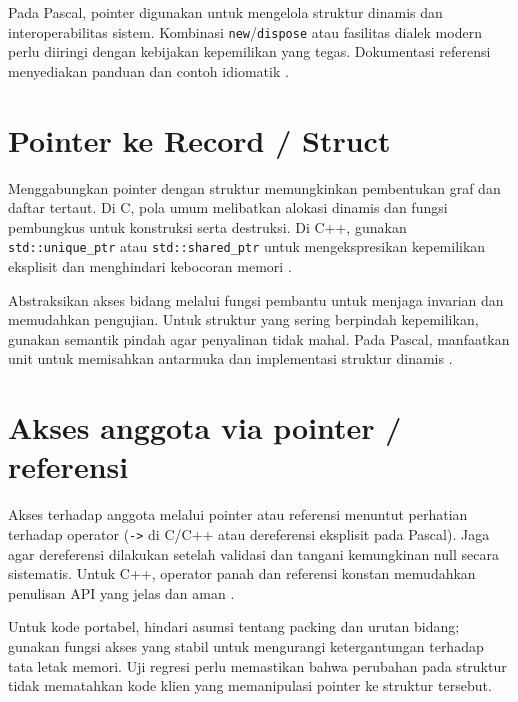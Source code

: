 \documentclass[../main.tex]{subfiles}
\begin{document}
Pada Pascal, pointer digunakan untuk mengelola struktur dinamis dan interoperabilitas sistem. Kombinasi \texttt{new}/\texttt{dispose} atau fasilitas dialek modern perlu diiringi dengan kebijakan kepemilikan yang tegas. Dokumentasi referensi menyediakan panduan dan contoh idiomatik \parencite{free-pascal-docs,gnu-c-manual}.

\section{Pointer ke Record / Struct}
Menggabungkan pointer dengan struktur memungkinkan pembentukan graf dan daftar tertaut. Di C, pola umum melibatkan alokasi dinamis dan fungsi pembungkus untuk konstruksi serta destruksi. Di C++, gunakan \texttt{std::unique_ptr} atau \texttt{std::shared_ptr} untuk mengekspresikan kepemilikan eksplisit dan menghindari kebocoran memori \parencite{cpp-reference}.

Abstraksikan akses bidang melalui fungsi pembantu untuk menjaga invarian dan memudahkan pengujian. Untuk struktur yang sering berpindah kepemilikan, gunakan semantik pindah agar penyalinan tidak mahal. Pada Pascal, manfaatkan unit untuk memisahkan antarmuka dan implementasi struktur dinamis \parencite{free-pascal-docs}.

\section{Akses anggota via pointer / referensi}
Akses terhadap anggota melalui pointer atau referensi menuntut perhatian terhadap operator (\texttt{->} di C/C++ atau dereferensi eksplisit pada Pascal). Jaga agar dereferensi dilakukan setelah validasi dan tangani kemungkinan null secara sistematis. Untuk C++, operator panah dan referensi konstan memudahkan penulisan API yang jelas dan aman \parencite{gnu-c-manual,cpp-reference}.

Untuk kode portabel, hindari asumsi tentang packing dan urutan bidang; gunakan fungsi akses yang stabil untuk mengurangi ketergantungan terhadap tata letak memori. Uji regresi perlu memastikan bahwa perubahan pada struktur tidak mematahkan kode klien yang memanipulasi pointer ke struktur tersebut.
\end{document}
